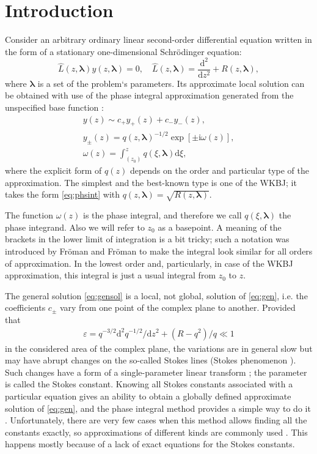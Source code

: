 \documentclass[atmp]{ipart_v1}
\def\LL{\widehat{L}}
\def\rmd{\mathrm{d}}
\def\rmi{\mathrm{i}}
\def\lmbd{\bm{\lambda}}
\def\w{\omega}
\newcommand\eref[1]{\eqref{#1}}
\newcommand\phsintgrnd[1][z]{q(#1,\lmbd)}
\newcommand\predexp[1][z]{q(#1,\lmbd)^{-1/2}}
\newcommand\phsintgrl[3][z]{\int_{#2}^{#3} \phsintgrnd[#1] \rmd #1}
\begin{document}
\section{Introduction \label{sec:intro}}
Consider an arbitrary ordinary linear second-order differential equation 
written in the form of a stationary one-dimensional Schr\"odinger equation:
\begin{equation}
\LL(z,\lmbd)y(z,\lmbd)=0, \quad \LL(z,\lmbd)=\frac{\rmd^2}{\rmd z^2} + R(z,\lmbd),   \label{eq:gen}
\end{equation}
where $\lmbd$ is a set of the problem`s parameters. Its approximate local solution can be
obtained with use of the phase integral approximation generated 
from the unspecified base function \cite{frbook}:
\begin{subequations}
\label{eq:phsint}
\begin{eqnarray}
y(z) \sim c_+y_+(z) + c_-y_-(z), \label{eq:gensol}
\\
y_\pm(z) = \predexp \exp [\pm \rmi \w(z)], \label{eq:phbase}
\\
\w(z)=\phsintgrl[\xi]{(z_0)}{z}, \label{eq:phase}
\end{eqnarray}
\end{subequations}
where the explicit form of $q(z)$ depends on the order and particular type of the approximation.
The simplest and the best-known type is one of the WKBJ\cite{wkb1,wkb2,wkb3,wkbj}; 
it takes the form \eref{eq:phsint} with $\phsintgrnd = \sqrt{R(z,\lmbd)}$. 

The function $\w(z)$ is the phase integral, and therefore we call $\phsintgrnd[\xi]$ 
the phase integrand. Also we will refer to $z_0$ as a basepoint.
A meaning of the brackets in the lower limit of integration is 
a bit tricky; such a notation was introduced by Fr\"oman and Fr\"oman \cite{frpaper} 
to make the integral look similar for all orders of approximation. In the lowest order and, 
particularly, in case of the WKBJ approximation, this integral is just a usual integral from $z_0$ to $z$.

The general solution \eref{eq:gensol} is a local, not global, solution of \eref{eq:gen}, i.e.
the coefficients $c_\pm$ vary from one point of the complex plane to another. Provided
that
\begin{eqnarray}
\varepsilon = q^{-3/2} \rmd^2 q^{-1/2}/\rmd z^2  + (R - q^2)/q \ll 1   \label{eq:cond}
\end{eqnarray}
in the considered area of the complex plane, the variations are in general slow
but may have abrupt changes on the so-called Stokes lines 
(Stokes phenomenon \cite{stokes,rwbook,heading,frbook}). Such 
changes have a form of a single-parameter linear transform \cite{heading}; 
the parameter is called the Stokes constant. 
Knowing all Stokes constants associated with a particular 
equation gives an ability to obtain a globally defined approximate solution 
of \eref{eq:gen}, and the phase integral method provides a simple 
way to do it \cite{heading,rwbook}. Unfortunately, there are very few 
cases when this method allows finding all the constants exactly, so approximations of different 
kinds are commonly used \cite{rwbook,ours}. This happens mostly because of a lack of exact 
equations for the Stokes constants.
\end{document}
